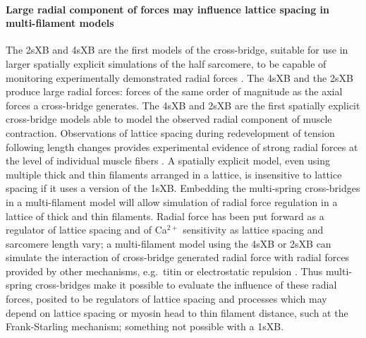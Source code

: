\documentclass[]{article}
\begin{document}
\paragraph{Large radial component of forces may influence lattice spacing in multi-filament models} %
The 2sXB and 4sXB are the first models of the cross-bridge, suitable for use in larger spatially explicit simulations of the half sarcomere, to be capable of monitoring experimentally demonstrated radial forces \citep{Cecchi1990, Millman1998}. 
The 4sXB and the 2sXB produce large radial forces: forces of the same order of magnitude as the axial forces a cross-bridge generates. 
The 4sXB and 2sXB are the first spatially explicit cross-bridge models able to model the observed radial component of muscle contraction.
Observations of lattice spacing during redevelopment of tension following length changes provides experimental evidence of strong radial forces at the level of individual muscle fibers \citep{Cecchi1990}. %
A spatially explicit model, even using multiple thick and thin filaments arranged in a lattice, is insensitive to lattice spacing if it uses a version of the 1sXB\@.
Embedding the multi-spring cross-bridges in a multi-filament model will allow simulation of radial force regulation in a lattice of thick and thin filaments.  
Radial force has been put forward as a regulator of lattice spacing and of Ca$^{2+}$ sensitivity as lattice spacing and sarcomere length vary; a multi-filament model using the 4sXB or 2sXB can simulate the interaction of cross-bridge generated radial force with radial forces provided by other mechanisms, e.g.\ titin or electrostatic repulsion \citep{Martyn2004, Cazorla2001, Millman1998}. 
Thus multi-spring cross-bridges make it possible to evaluate the influence of these radial forces, posited to be regulators of lattice spacing and processes which may depend on lattice spacing or myosin head to thin filament distance, such at the Frank-Starling mechanism; something not possible with a 1sXB\@. 
\end{document}
